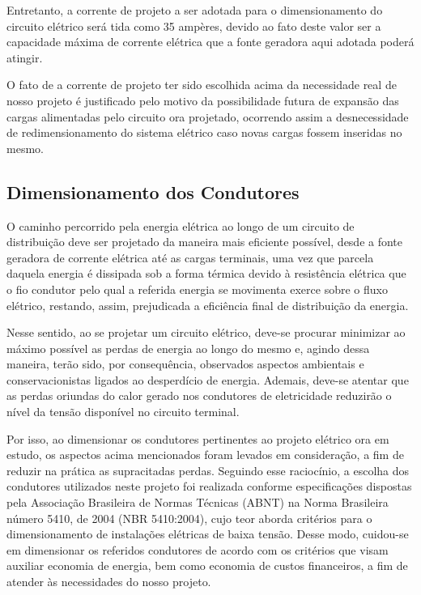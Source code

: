 	Entretanto, a corrente de projeto a ser adotada para o dimensionamento do circuito elétrico será tida como 35 ampères, devido ao fato deste valor ser a capacidade máxima de corrente elétrica que a fonte geradora aqui adotada poderá atingir.
	
	O fato de a corrente de projeto ter sido escolhida acima da necessidade real de nosso projeto é justificado pelo motivo da possibilidade futura de expansão das cargas alimentadas pelo circuito ora projetado, ocorrendo assim a desnecessidade de redimensionamento do sistema elétrico caso novas cargas fossem inseridas no mesmo.

\subsection{Dimensionamento dos Condutores}

O caminho percorrido pela energia elétrica ao longo de um circuito de distribuição deve ser projetado da maneira mais eficiente possível, desde a fonte geradora de corrente elétrica até as cargas terminais, uma vez que parcela daquela energia é dissipada sob a forma térmica devido à resistência elétrica que o fio condutor pelo qual a referida energia se movimenta exerce sobre o fluxo elétrico, restando, assim, prejudicada a eficiência final de distribuição da energia.

Nesse sentido, ao se projetar um circuito elétrico, deve-se procurar minimizar ao máximo possível as perdas de energia ao longo do mesmo e, agindo dessa maneira, terão sido, por consequência, observados aspectos ambientais e conservacionistas ligados ao desperdício de energia. Ademais, deve-se atentar que as perdas oriundas do calor gerado nos condutores de eletricidade reduzirão o nível da tensão disponível no circuito terminal.

Por isso, ao dimensionar os condutores pertinentes ao projeto elétrico ora em estudo, os aspectos acima mencionados foram levados em consideração, a fim de reduzir na prática as supracitadas perdas.
Seguindo esse raciocínio, a escolha dos condutores utilizados neste projeto foi realizada conforme especificações dispostas pela Associação Brasileira de Normas Técnicas (ABNT) na Norma Brasileira número 5410, de 2004 (NBR 5410:2004), cujo teor aborda critérios para o dimensionamento de instalações elétricas de baixa tensão. 
Desse modo, cuidou-se em dimensionar os referidos condutores de acordo com os critérios que visam auxiliar economia de energia, bem como economia de custos financeiros, a fim de atender às necessidades do nosso projeto.

